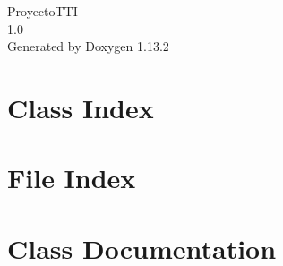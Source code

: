 \documentclass[twoside]{book}
\newcommand{\+}{\discretionary{\mbox{\scriptsize$\hookleftarrow$}}{}{}}
\newcommand{\clearemptydoublepage}{%
    \newpage{\pagestyle{empty}\cleardoublepage}%
  }
\begin{document}
  \raggedbottom
    \hypersetup{pageanchor=false,
                bookmarksnumbered=true,
                pdfencoding=unicode
               }
  \begin{titlepage}
  \vspace*{7cm}
  \begin{center}%
  {\Large Proyecto\+TTI}\\
  [1ex]\large 1.\+0 \\
  \vspace*{1cm}
  {\large Generated by Doxygen 1.13.2}\\
  \end{center}
  \end{titlepage}
  \clearemptydoublepage
  \tableofcontents
  \clearemptydoublepage
  \hypersetup{pageanchor=true}

\chapter{Class Index}

\chapter{File Index}

\chapter{Class Documentation}


\end{document}
